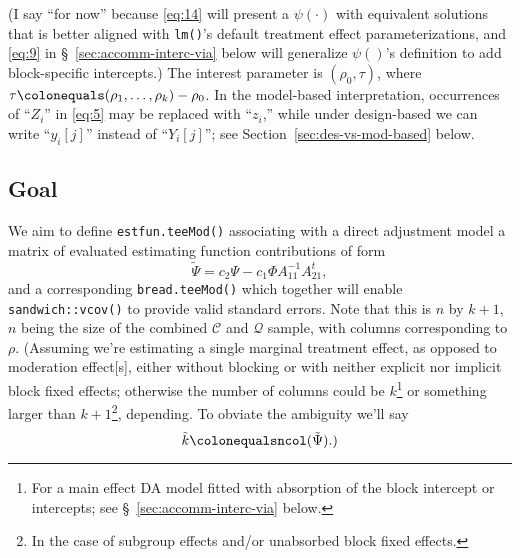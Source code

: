 \documentclass{article}
\newcommand{\defeq}{\ensuremath{\colonequals}}
\begin{document}
(I say ``for now'' because \eqref{eq:14} will present a
$\psi(\cdot)$ with equivalent solutions that is better aligned with
\texttt{lm()}'s default treatment effect parameterizations, and
\eqref{eq:9} in \S~\ref{sec:accomm-interc-via} below will generalize $\psi()$'s definition
to add block-specific intercepts.)
The interest parameter is $(\rho_{0}, \tau)$, where $\tau \defeq (\rho_{1}, \ldots, \rho_{k}) - \rho_{0}$. In the model-based interpretation, occurrences of ``$Z_{i}$'' in \eqref{eq:5} may be replaced with ``$z_{i}$,'' while under design-based we can write ``$y_{i}[j]$'' instead of ``$Y_{i}[j]$''; see Section~\ref{sec:des-vs-mod-based} below.

\subsection{Goal} \label{sec:goal}
We aim to define \texttt{estfun.teeMod()} associating
with a direct adjustment model a matrix of evaluated estimating function
contributions of form
\begin{equation} \label{eq:22}
  \tilde{\Psi} = c_{2}\Psi - c_{1}\Phi A_{11}^{-1}A_{21}^{t},
\end{equation}
and a corresponding \texttt{bread.teeMod()} which together will enable \texttt{sandwich::vcov()} to provide valid standard errors. 
Note that this is $n$ by
$k+1$, $n$ being the size of the combined $\mathcal{C}$ and
$\mathcal{Q}$ sample, with columns corresponding to $\rho$.%
(Assuming we're estimating a single marginal treatment effect, as
opposed to moderation effect[s], either without blocking or with
neither explicit nor implicit block fixed effects; otherwise the
number of columns could be $k$\footnote{For a main effect
DA model fitted with absorption of the block intercept or
intercepts; see \S~\ref{sec:accomm-interc-via} below.} or something
larger than $k+1$\footnote{In the case of subgroup effects and/or unabsorbed block fixed effects.},
depending. To obviate the ambiguity we'll say
\begin{equation*}
  \tilde{k} \defeq \mathtt{ncol}(\tilde{\Psi}).)
\end{equation*}
\end{document}
